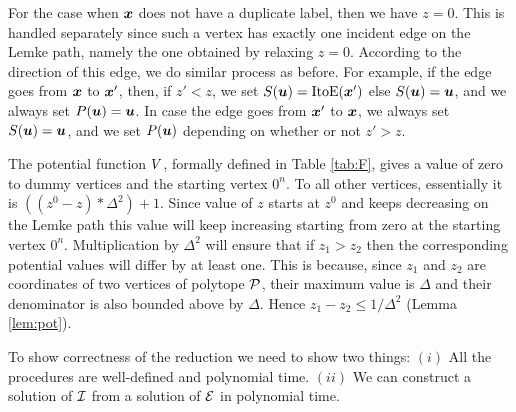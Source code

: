 For the case when $\mbox{\boldmath $x$}$ does not have a duplicate label, then we have $z=0$. This is
handled separately since such a vertex has exactly one incident edge on the Lemke
path, namely the one obtained by relaxing $z=0$. According to the direction of 
this edge, we do similar process as before. For example, if the edge goes from 
$\mbox{\boldmath $x$}$ to $\mbox{\boldmath $x$}'$, then, if $z'<z$, we set $S(\mbox{\boldmath $u$})=\mbox{ItoE}(\mbox{\boldmath $x$}')$ else $S(\mbox{\boldmath $u$})=\mbox{\boldmath $u$}$,
and we always set $P(\mbox{\boldmath $u$})=\mbox{\boldmath $u$}$.  In case the edge goes from $\mbox{\boldmath $x$}'$ to $\mbox{\boldmath $x$}$, we
always set $S(\mbox{\boldmath $u$})=\mbox{\boldmath $u$}$, and we set $P(\mbox{\boldmath $u$})$ depending on whether or not $z'>z$.

%
\medskip

The potential function $\mbox{$V$}$, formally defined in Table \ref{tab:F},
gives a value of zero to dummy vertices and the starting vertex $0^n$. To all
other vertices, essentially it is $((z^0-z) * \Delta^2)+1$. Since value of $z$
starts at $z^0$ and keeps decreasing on the Lemke path this value will keep
increasing starting from zero at the starting vertex $0^n$. Multiplication by
$\Delta^2$ will ensure that if $z_1>z_2$ then the corresponding potential values 
will differ by at least one. This is because, since $z_1$ and $z_2$ are 
coordinates of two vertices of polytope $\mbox{${\mathcal P}$}$, their maximum value is $\Delta$
and their denominator is also bounded above by $\Delta$. Hence $z_1-z_2\le
1/\Delta^2$ (Lemma \ref{lem:pot}).  

To show correctness of the reduction we need to show two things: $(i)$ All the procedures are well-defined and polynomial time. $(ii)$ We can construct a solution of $\mbox{${\mathcal I}$}$ from a solution of $\mbox{${\mathcal E}$}$ in polynomial time. 



